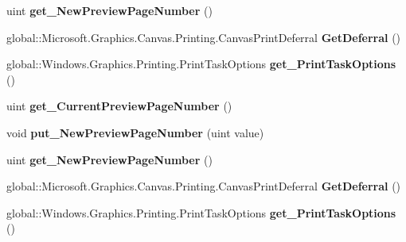 \begin{DoxyCompactItemize}
uint {\bfseries get\+\_\+\+New\+Preview\+Page\+Number} ()
\item 
\mbox{\label{interface_microsoft_1_1_graphics_1_1_canvas_1_1_printing_1_1_i_canvas_print_task_options_changed_event_args_a708f792da3dfbf1a9e784b107a4bc9ac}} 
global\+::\+Microsoft.\+Graphics.\+Canvas.\+Printing.\+Canvas\+Print\+Deferral {\bfseries Get\+Deferral} ()
\item 
\mbox{\label{interface_microsoft_1_1_graphics_1_1_canvas_1_1_printing_1_1_i_canvas_print_task_options_changed_event_args_a582826beab15f204cd75529fa4342e80}} 
global\+::\+Windows.\+Graphics.\+Printing.\+Print\+Task\+Options {\bfseries get\+\_\+\+Print\+Task\+Options} ()
\item 
\mbox{\label{interface_microsoft_1_1_graphics_1_1_canvas_1_1_printing_1_1_i_canvas_print_task_options_changed_event_args_a780e5aabcae68d34509c24c332fa47fe}} 
uint {\bfseries get\+\_\+\+Current\+Preview\+Page\+Number} ()
\item 
\mbox{\label{interface_microsoft_1_1_graphics_1_1_canvas_1_1_printing_1_1_i_canvas_print_task_options_changed_event_args_a47152d289684fc7680e2bac366e3df74}} 
void {\bfseries put\+\_\+\+New\+Preview\+Page\+Number} (uint value)
\item 
\mbox{\label{interface_microsoft_1_1_graphics_1_1_canvas_1_1_printing_1_1_i_canvas_print_task_options_changed_event_args_a8baa3585b768e97ec0a95e2b69f0c3d7}} 
uint {\bfseries get\+\_\+\+New\+Preview\+Page\+Number} ()
\item 
\mbox{\label{interface_microsoft_1_1_graphics_1_1_canvas_1_1_printing_1_1_i_canvas_print_task_options_changed_event_args_a708f792da3dfbf1a9e784b107a4bc9ac}} 
global\+::\+Microsoft.\+Graphics.\+Canvas.\+Printing.\+Canvas\+Print\+Deferral {\bfseries Get\+Deferral} ()
\item 
\mbox{\label{interface_microsoft_1_1_graphics_1_1_canvas_1_1_printing_1_1_i_canvas_print_task_options_changed_event_args_a582826beab15f204cd75529fa4342e80}} 
global\+::\+Windows.\+Graphics.\+Printing.\+Print\+Task\+Options {\bfseries get\+\_\+\+Print\+Task\+Options} ()
\end{DoxyCompactItemize}


